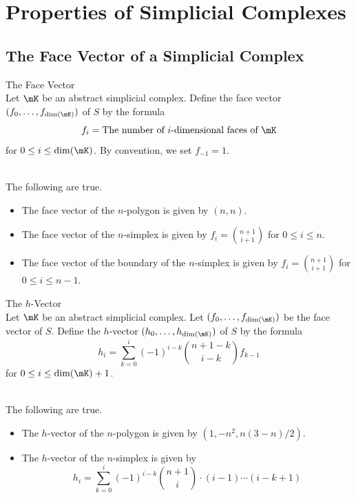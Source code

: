 \documentclass[a4paper]{article}
\begin{document}
\pagebreak
\section{Properties of Simplicial Complexes}
\subsection{The Face Vector of a Simplicial Complex}
\begin{defn}{The Face Vector}{}\\
Let $\mK$ be an abstract simplicial complex. Define the face vector $(f_0,\dots,f_{\dim(\mK)})$ of $S$ by the formula $$f_i=\text{The number of }i\text{-dimensional faces of }\mK$$ for $0\leq i\leq\dim(\mK)$. By convention, we set $f_{-1}=1$. 
\end{defn}

\begin{eg}{}{}\\
The following are true. 
\begin{itemize}
\item The face vector of the $n$-polygon is given by $(n,n)$. 
\item The face vector of the $n$-simplex is given by $f_i=\binom{n+1}{i+1}$ for $0\leq i\leq n$. 
\item The face vector of the boundary of the $n$-simplex is given by $f_i=\binom{n+1}{i+1}$ for $0\leq i\leq n-1$. 
\end{itemize}
\end{eg}

\begin{defn}{The $h$-Vector}{}\\
Let $\mK$ be an abstract simplicial complex. Let $(f_0,\dots,f_{\dim(\mK)})$ be the face vector of $S$. Define the $h$-vector $(h_0,\dots,h_{\dim(\mK)})$ of $S$ by the formula $$h_i=\sum_{k=0}^i(-1)^{i-k}\binom{n+1-k}{i-k}f_{k-1}$$ for $0\leq i\leq\dim(\mK)+1$. 
\end{defn}

\begin{eg}{}{}\\
The following are true. 
\begin{itemize}
\item The $h$-vector of the $n$-polygon is given by $(1,-n^2,n(3-n)/2)$. 
\item The $h$-vector of the $n$-simplex is given by $$h_i=\sum_{k=0}^i(-1)^{i-k}\binom{n+1}{i}\cdot(i-1)\cdots(i-k+1)$$
\end{itemize}
\end{eg}
\end{document}
